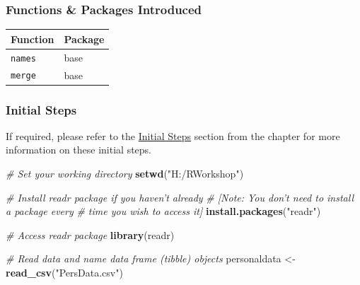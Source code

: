 \documentclass[]{book}
\newenvironment{Shaded}{\begin{snugshade}}{\end{snugshade}}
\newcommand{\KeywordTok}[1]{\textcolor[rgb]{0.13,0.29,0.53}{\textbf{#1}}}
\newcommand{\StringTok}[1]{\textcolor[rgb]{0.31,0.60,0.02}{#1}}
\newcommand{\CommentTok}[1]{\textcolor[rgb]{0.56,0.35,0.01}{\textit{#1}}}
\newcommand{\NormalTok}[1]{#1}
\begin{document}
\subsubsection*{Functions \& Packages
Introduced}\label{functions-packages-introduced}

\begin{longtable}[]{@{}ll@{}}
\toprule
Function & Package\tabularnewline
\midrule
\endhead
\texttt{names} & base\tabularnewline
\texttt{merge} & base\tabularnewline
\bottomrule
\end{longtable}

\subsubsection*{Initial Steps}\label{initsteps_join_supp}

If required, please refer to the
\protect\hyperlink{initsteps_join}{Initial Steps} section from the
chapter for more information on these initial steps.

\begin{Shaded}
\begin{Highlighting}[]
\CommentTok{# Set your working directory}
\KeywordTok{setwd}\NormalTok{(}\StringTok{"H:/RWorkshop"}\NormalTok{)}
\end{Highlighting}
\end{Shaded}

\begin{Shaded}
\begin{Highlighting}[]
\CommentTok{# Install readr package if you haven't already}
\CommentTok{# [Note: You don't need to install a package every }
\CommentTok{# time you wish to access it]}
\KeywordTok{install.packages}\NormalTok{(}\StringTok{"readr"}\NormalTok{)}
\end{Highlighting}
\end{Shaded}

\begin{Shaded}
\begin{Highlighting}[]
\CommentTok{# Access readr package}
\KeywordTok{library}\NormalTok{(readr)}

\CommentTok{# Read data and name data frame (tibble) objects}
\NormalTok{personaldata <-}\StringTok{ }\KeywordTok{read_csv}\NormalTok{(}\StringTok{"PersData.csv"}\NormalTok{)}
\end{Highlighting}
\end{Shaded}
\end{document}
